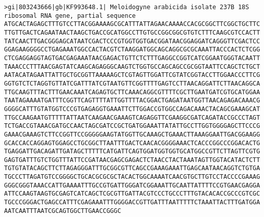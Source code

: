 \documentclass[11pt]{article}
\begin{document}
\begin{Verbatim}[commandchars=\\\{\}]
>gi|803243666|gb|KF993648.1| Meloidogyne arabicida isolate 237B 18S ribosomal RNA gene, partial sequence
ATGCACTAGAGCTTTGTCCTTACGGAAAAGCGCATTTATTAGAACAAAACCACGCGGCTTCGGCTGCTTC
TTGTTGACTCAGAATAACTAAGCTGACCGCATGGCCTTGTGCCGGCGGCGTGTCTTTCAAGCGTCCACTT
TATCAACTTGACGGGAGCATAATCGACTCCCGTGGTGGTGACGGATAACGGAGGATCAGGGTTCGACTCC
GGAGAAGGGGCCTGAGAAATGGCCACTACGTCTAAGGATGGCAGCAGGCGCGCAAATTACCCACTCTCGG
CTCGAGGAGGTAGTGACGAGAAATAACGAGACTGTTCTCTTTGAGGCCGGTCATCGGAATGGGTACAATT
TAAACCCTTTAACGAGTATCAAGCAGAGGGCAAGTCTGGTGCCAGCAGCCGCGGTAATTCCAGCTCTGCT
AATACATAGAATTATTGCTGCGGTTAAAAAGCTCGTAGTTGGATTCGTATCGGTACCTTGGAACCCTTCG
GGTGTCTCTAGGTGTTATCGATTTATCGTAATGTTCGGTTTTGAGTCCTTAACAGGATTCTTAACAGGCA
TTGCAAGTTTACTTTGAACAAATCAGAGTGCTTCAAACAGGCGTTTTCGCTTGAATGATCGTGCATGGAA
TAATAGAAAATGATTTCGGTTCAGTTTTATTGGTTTTACGGACTGAGATAATGGTTAACAGAGACAAACG
GGGGCATTTGTATGGTCCCGTGAGAGGTGAAATTCTTGGACCGTGGCCAGACAAACTACAGCGAAAGCAT
TTGCCAAGAATGTTTTTATTAATCAAGAACGAAAGTCAGAGGTTCGAAGGCGATCAGATACCGCCCTAGT
TCTGACCGTAAACGATGCCAACTAGCGATCCGCTGATGGAAATTATATTGCCTTGGTGGGGAGCTTCCCG
GAAACGAAAGTCTTCCGGTTCCGGGGGAAGTATGGTTGCAAAGCTGAAACTTAAAGGAATTGACGGAAGG
GCACCACCAGGAGTGGAGCCTGCGGCTTAATTTGACTCAACACGGGGAAACTCACCCGGCCCGGACACTG
TGAGGATTGACAGATTGATAGCTTTTTCATGATTCAGTGGATGGTGGTGCATGGCCGTTCTTAGTTCGTG
GAGTGATTTGTCTGGTTTATTCCGATAACGAGCGAGACTCTAACCTACTAAATAGTTGGTACATACTCTT
TGTGTATACAGCTTCTTAGAGGGATTTGCGGCGTTCAGCCGAAAGAAATTGAGCAATAACAGGTCTGTGA
TGCCCTTAGATGTCCGGGGCTGCACGCGCGCTACACTGGCAAAATCAACGTGCTTGTCCTACCCCGAAAG
GGGCGGGTAAACCATTGAAAATTTGCCGTGATTGGGATCGGAAATTGCAATTATTTTCCGTGAACGAGGA
ATTCCAAGTAAGTGCGAGTCATCAGCTCGCGTTGATTACGTCCCTGCCCTTTGTACACACCGCCCGTCGC
TGCCCGGGACTGAGCCATTTCGAGAAATTTGGGGACCGTTGATTTAATTTTTCTAAATTACTTTGATGGA
AATCAATTTAATCGCAGTGGCTTGAACCGGGC


\end{Verbatim}
\end{document}
